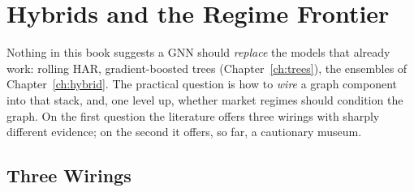 \section{Hybrids and the Regime Frontier}\label{sec:gnn:hybrids}

Nothing in this book suggests a GNN should \emph{replace} the models that already work: rolling HAR, gradient-boosted trees (Chapter~\ref{ch:trees}), the ensembles of Chapter~\ref{ch:hybrid}. The practical question is how to \emph{wire} a graph component into that stack, and, one level up, whether market regimes should condition the graph. On the first question the literature offers three wirings with sharply different evidence; on the second it offers, so far, a cautionary museum.

\subsection{Three Wirings}\label{sec:gnn:wirings}

